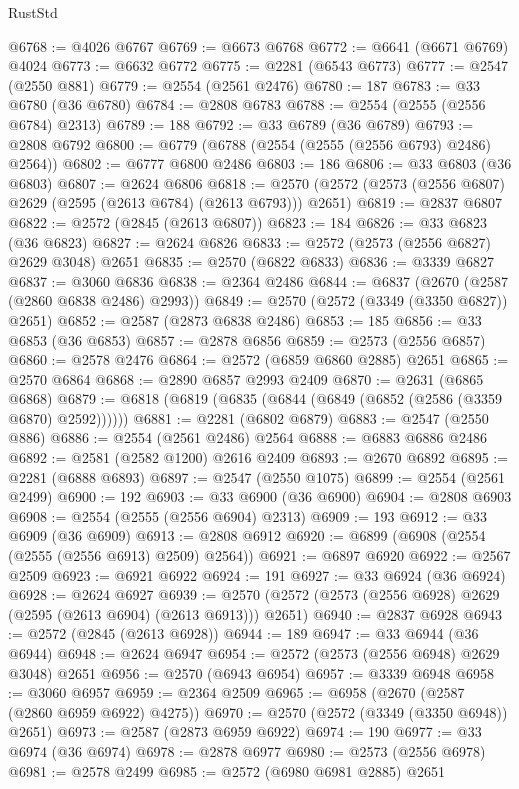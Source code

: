 \begin{lexlean}{RustStd}
\begin{coremodule}
@6768 := @4026 @6767
@6769 := @6673 @6768
@6772 := @6641 (@6671 @6769) @4024
@6773 := @6632 @6772
@6775 := @2281 (@6543 @6773)
@6777 := @2547 (@2550 @881)
@6779 := @2554 (@2561 @2476)
@6780 := 187
@6783 := @33 @6780 (@36 @6780)
@6784 := @2808 @6783
@6788 := @2554 (@2555 (@2556 @6784) @2313)
@6789 := 188
@6792 := @33 @6789 (@36 @6789)
@6793 := @2808 @6792
@6800 := @6779 (@6788 (@2554 (@2555 (@2556 @6793) @2486) @2564))
@6802 := @6777 @6800 @2486
@6803 := 186
@6806 := @33 @6803 (@36 @6803)
@6807 := @2624 @6806
@6818 := @2570 (@2572 (@2573 (@2556 @6807) @2629 (@2595 (@2613 @6784) (@2613 @6793))) @2651)
@6819 := @2837 @6807
@6822 := @2572 (@2845 (@2613 @6807))
@6823 := 184
@6826 := @33 @6823 (@36 @6823)
@6827 := @2624 @6826
@6833 := @2572 (@2573 (@2556 @6827) @2629 @3048) @2651
@6835 := @2570 (@6822 @6833)
@6836 := @3339 @6827
@6837 := @3060 @6836
@6838 := @2364 @2486
@6844 := @6837 (@2670 (@2587 (@2860 @6838 @2486) @2993))
@6849 := @2570 (@2572 (@3349 (@3350 @6827)) @2651)
@6852 := @2587 (@2873 @6838 @2486)
@6853 := 185
@6856 := @33 @6853 (@36 @6853)
@6857 := @2878 @6856
@6859 := @2573 (@2556 @6857)
@6860 := @2578 @2476
@6864 := @2572 (@6859 @6860 @2885) @2651
@6865 := @2570 @6864
@6868 := @2890 @6857 @2993 @2409
@6870 := @2631 (@6865 @6868)
@6879 := @6818 (@6819 (@6835 (@6844 (@6849 (@6852 (@2586 (@3359 @6870) @2592))))))
@6881 := @2281 (@6802 @6879)
@6883 := @2547 (@2550 @886)
@6886 := @2554 (@2561 @2486) @2564
@6888 := @6883 @6886 @2486
@6892 := @2581 (@2582 @1200) @2616 @2409
@6893 := @2670 @6892
@6895 := @2281 (@6888 @6893)
@6897 := @2547 (@2550 @1075)
@6899 := @2554 (@2561 @2499)
@6900 := 192
@6903 := @33 @6900 (@36 @6900)
@6904 := @2808 @6903
@6908 := @2554 (@2555 (@2556 @6904) @2313)
@6909 := 193
@6912 := @33 @6909 (@36 @6909)
@6913 := @2808 @6912
@6920 := @6899 (@6908 (@2554 (@2555 (@2556 @6913) @2509) @2564))
@6921 := @6897 @6920
@6922 := @2567 @2509
@6923 := @6921 @6922
@6924 := 191
@6927 := @33 @6924 (@36 @6924)
@6928 := @2624 @6927
@6939 := @2570 (@2572 (@2573 (@2556 @6928) @2629 (@2595 (@2613 @6904) (@2613 @6913))) @2651)
@6940 := @2837 @6928
@6943 := @2572 (@2845 (@2613 @6928))
@6944 := 189
@6947 := @33 @6944 (@36 @6944)
@6948 := @2624 @6947
@6954 := @2572 (@2573 (@2556 @6948) @2629 @3048) @2651
@6956 := @2570 (@6943 @6954)
@6957 := @3339 @6948
@6958 := @3060 @6957
@6959 := @2364 @2509
@6965 := @6958 (@2670 (@2587 (@2860 @6959 @6922) @4275))
@6970 := @2570 (@2572 (@3349 (@3350 @6948)) @2651)
@6973 := @2587 (@2873 @6959 @6922)
@6974 := 190
@6977 := @33 @6974 (@36 @6974)
@6978 := @2878 @6977
@6980 := @2573 (@2556 @6978)
@6981 := @2578 @2499
@6985 := @2572 (@6980 @6981 @2885) @2651

\end{coremodule}
\end{lexlean}
